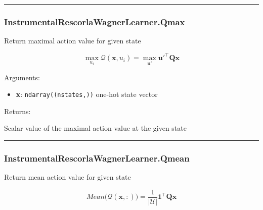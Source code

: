 \begin{center}\rule{0.5\linewidth}{\linethickness}\end{center}

\subsubsection{InstrumentalRescorlaWagnerLearner.Qmax}\label{instrumentalrescorlawagnerlearner.qmax}

\begin{Shaded}
\begin{Highlighting}[]
\end{Highlighting}
\end{Shaded}

Return maximal action value for given state

\[
\max_{u_i}\mathcal Q(\mathbf x, u_i) = \max_{\mathbf u'} \mathbf u'^\top \mathbf Q \mathbf x
\]

Arguments:

\begin{itemize}
\tightlist
\item
  \textbf{x}: \texttt{ndarray((nstates,))} one-hot state vector
\end{itemize}

Returns:

Scalar value of the maximal action value at the given state

\begin{center}\rule{0.5\linewidth}{\linethickness}\end{center}

\subsubsection{InstrumentalRescorlaWagnerLearner.Qmean}\label{instrumentalrescorlawagnerlearner.qmean}

\begin{Shaded}
\begin{Highlighting}[]
\end{Highlighting}
\end{Shaded}

Return mean action value for given state

\[
Mean \big(\mathcal Q(\mathbf x, :)\big) = \frac{1}{|\mathcal U|} \mathbf 1^\top \mathbf Q \mathbf x
\]

